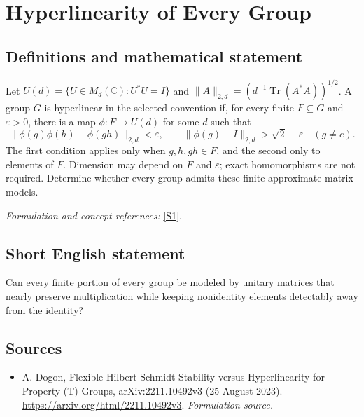 \documentclass[11pt]{article}
\begin{document}
\section*{\texorpdfstring{Hyperlinearity of Every Group}{Hyperlinearity of Every Group}}\label{30006756}
\subsection{Definitions and mathematical statement}
Let $U(d)=\{U\in M_d({\mathbb{C}}):U^*U=I\}$ and
$\|A\|_{2,d}=(d^{-1}\operatorname{Tr}(A^*A))^{1/2}$. A group $G$ is hyperlinear in the selected convention if, for every finite $F\subseteq G$ and ${\varepsilon}>0$, there is a map $\phi:F\to U(d)$ for some $d$ such that
\[
 \|\phi(g)\phi(h)-\phi(gh)\|_{2,d}<{\varepsilon},
 \qquad \|\phi(g)-I\|_{2,d}>\sqrt2-{\varepsilon}\quad(g\ne e).
\]
The first condition applies only when $g,h,gh\in F$, and the second only to elements of $F$. Dimension may depend on $F$ and ${\varepsilon}$; exact homomorphisms are not required. Determine whether every group admits these finite approximate matrix models.
\par\smallskip\textit{Formulation and concept references:} \href{https://arxiv.org/html/2211.10492v3}{[S1]}.

\subsection{Short English statement}
Can every finite portion of every group be modeled by unitary matrices that nearly preserve multiplication while keeping nonidentity elements detectably away from the identity?
\subsection{Sources}
\begin{itemize}
\item[S1]A. Dogon, Flexible Hilbert-Schmidt Stability versus Hyperlinearity for Property (T) Groups, arXiv:2211.10492v3 (25 August 2023).
\url{https://arxiv.org/html/2211.10492v3}.
\textit{Formulation source.}
\end{itemize}
\end{document}
